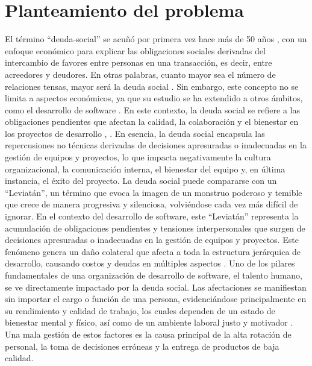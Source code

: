 \section{Planteamiento del problema}
El término ``\gls{deuda-social}'' se acuñó por primera vez hace más de 50 años \cite{muir1962socialdebt}, con un enfoque económico para explicar las obligaciones sociales derivadas del intercambio de favores entre personas en una transacción, es decir, entre acreedores y deudores. En otras palabras, cuanto mayor sea el número de relaciones tensas, mayor será la deuda social \cite{caballero2022communitysmells}. Sin embargo, este concepto no se limita a aspectos económicos, ya que su estudio se ha extendido a otros ámbitos, como el desarrollo de software \cite{caballero2022communitysmells}. En este contexto, la deuda social se refiere a las obligaciones pendientes que afectan la calidad, la colaboración y el bienestar en los proyectos de desarrollo \cite{caballero2022communitysmells}, \cite{tamburri2013socialdebt}. En esencia, la deuda social encapsula las repercusiones no técnicas derivadas de decisiones apresuradas o inadecuadas en la gestión de equipos y proyectos, lo que impacta negativamente la cultura organizacional, la comunicación interna, el bienestar del equipo y, en última instancia, el éxito del proyecto.
La deuda social puede compararse con un ``Leviatán'', un término que evoca la imagen de un monstruo poderoso y temible que crece de manera progresiva y silenciosa, volviéndose cada vez más difícil de ignorar. En el contexto del desarrollo de software, este ``Leviatán'' representa la acumulación de obligaciones pendientes y tensiones interpersonales que surgen de decisiones apresuradas o inadecuadas en la gestión de equipos y proyectos. Este fenómeno genera un daño colateral que afecta a toda la estructura jerárquica de desarrollo, causando costos y deudas en múltiples aspectos \cite{caballero2022communitysmells}. Uno de los pilares fundamentales de una organización de desarrollo de software, el talento humano, se ve directamente impactado por la deuda social. Las afectaciones se manifiestan sin importar el cargo o función de una persona, evidenciándose principalmente en su rendimiento y calidad de trabajo, los cuales dependen de un estado de bienestar mental y físico, así como de un ambiente laboral justo y motivador \cite{caballero2022communitysmells}. Una mala gestión de estos factores es la causa principal de la alta rotación de personal, la toma de decisiones erróneas y la entrega de productos de baja calidad.
